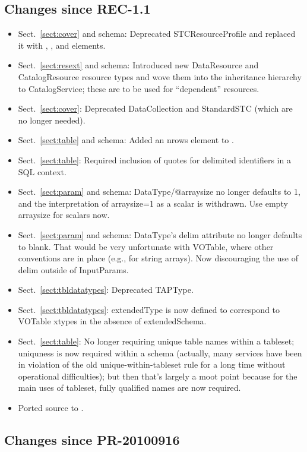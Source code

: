 \documentclass[11pt,a4paper]{ivoa}
\begin{document}
\subsection{Changes since REC-1.1}

\begin{itemize}
\item Sect.~\ref{sect:cover} and schema: Deprecated STCResourceProfile and replaced it with
, , and  elements.
\item Sect.~\ref{sect:resext} and schema:
Introduced new DataResource and CatalogResource resource types
and wove them into the inheritance hierarchy to CatalogService; these
are to be used for ``dependent'' resources.
\item Sect.~\ref{sect:cover}:
Deprecated DataCollection and StandardSTC (which are no longer
needed).
\item Sect.~\ref{sect:table}
and schema: Added an nrows element to .
\item Sect.~\ref{sect:table}:
Required inclusion of quotes for delimited identifiers in a
SQL context.
\item Sect.~\ref{sect:param} and schema:
DataType/@arraysize no longer defaults to 1, and the
interpretation of arraysize=1 as a scalar is withdrawn.  Use empty
arraysize for scalars now.
\item Sect.~\ref{sect:param} and schema:
DataType's delim attribute no longer defaults to blank.  That
would be very unfortunate with VOTable, where other conventions are in
place (e.g., for string arrays).  Now discouraging the use of delim
outside of InputParams.
\item Sect.~\ref{sect:tbldatatypes}: Deprecated TAPType.
\item Sect.~\ref{sect:tbldatatypes}:
extendedType is now defined to correspond to VOTable xtypes in the
absence of extendedSchema.
\item Sect.~\ref{sect:table}:
No longer requiring unique table names within a tableset;
uniquness is now required within a schema (actually, many services have
been in violation of the old unique-within-tableset rule for a long time
without operational difficulties); but then that's largely a moot point
because for the main uses of tableset, fully qualified names are now
required.
\item Ported source to \ivoatex.
\end{itemize}

\subsection{Changes since PR-20100916}
\end{document}
